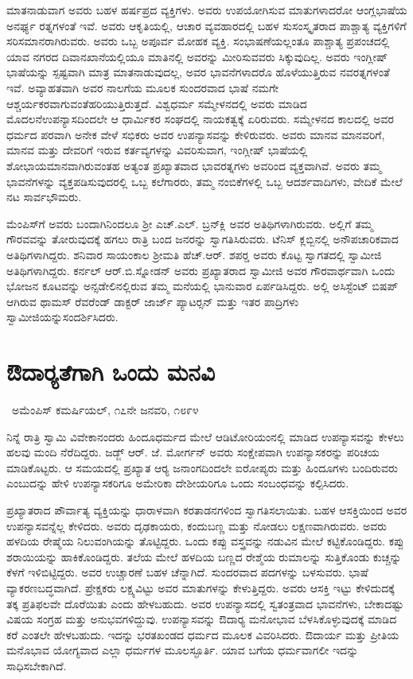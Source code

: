  ಮಾತನಾಡುವಾಗ ಅವರು ಬಹಳ ಹರ್ಷಪ್ರದ ವ್ಯಕ್ತಿಗಳು. ಅವರು ಉಪಯೋಗಿಸುವ ಮಾತುಗಳಾದರೋ ಆಂಗ್ಲಭಾಷೆಯ ಅನರ್ಘ್ಯ ರತ್ನಗಳಂತೆ ಇವೆ. ಅವರು ಆಕೃತಿಯಲ್ಲಿ, ಆಚಾರ ವ್ಯವಹಾರದಲ್ಲಿ ಬಹಳ ಸುಸಂಸ್ಕೃತರಾದ ಪಾಶ್ಚಾತ್ಯ ವ್ಯಕ್ತಿಗಳಿಗೆ ಸರಿಸಮಾನರಾಗಿರುವರು. ಅವರು ಒಬ್ಬ ಅಪೂರ್ವ ಮೋಹಕ ವ್ಯಕ್ತಿ. ಸಂಭಾಷಣೆಯಲ್ಲಂತೂ ಪಾಶ್ಚಾತ್ಯ ಪ್ರಪಂಚದಲ್ಲಿ ಯಾವ ನಗರದ ದಿವಾನಖಾನೆಯಲ್ಲಿಯೂ ಮಾತಿನಲ್ಲಿ ಅವರನ್ನು ಮೀರಿಸುವವರು ಸಿಕ್ಕುವುದಿಲ್ಲ. ಅವರು ಇಂಗ್ಲೀಷ್ ಭಾಷೆಯನ್ನು ಸ್ಪಷ್ಟವಾಗಿ ಮಾತ್ರ ಮಾತನಾಡುವುದಲ್ಲ, ಅವರ ಭಾವನೆಗಳಾದರೊ ಹೊಳೆಯುತ್ತಿರುವ ನವರತ್ನಗಳಂತೆ ಇವೆ. ಅವ್ಯಾಹತವಾಗಿ ಅವರ ನಾಲಗೆಯ ಮೂಲಕ ಸುಂದರವಾದ ಭಾಷೆ ನಮಗೇ ಆಶ್ಚರ್ಯಕರವಾಗುವಂತೆ\break ಹರಿಯುತ್ತಿರುತ್ತದೆ. ವಿಶ್ವಧರ್ಮ ಸಮ್ಮೇಳನದಲ್ಲಿ ಅವರು ಮಾಡಿದ ಮೊದಲನೆ\break ಉಪನ್ಯಾಸದಿಂದಲೇ ಆ ಧಾರ್ಮಿಕರ ಸಂಘದಲ್ಲಿ ನಾಯಕತ್ವಕ್ಕೆ ಏರಿರುವರು. ಸಮ್ಮೇಳನದ ಕಾಲದಲ್ಲಿ ಅವರ ಧರ್ಮದ ಪರವಾಗಿ ಅನೇಕ ವೇಳೆ ಸಭಿಕರು ಅವರ ಉಪನ್ಯಾಸವನ್ನು ಕೇಳಿರುವರು. ಅವರು ಮಾನವ ಮಾನವರಿಗೆ, ಮಾನವ ಮತ್ತು ದೇವರಿಗೆ ಇರುವ ಕರ್ತವ್ಯಗಳನ್ನು ವಿವರಿಸುವಾಗ, ಇಂಗ್ಲೀಷ್ ಭಾಷೆಯಲ್ಲಿ ಶೋಭಾಯಮಾನವಾಗಿರುವಂತಹ ಅತ್ಯಂತ ಪ್ರಖ್ಯಾತವಾದ ಭಾವರತ್ನಗಳು ಅವರಿಂದ ವ್ಯಕ್ತವಾಗಿವೆ. ಅವರು ತಮ್ಮ ಭಾವನೆಗಳನ್ನು ವ್ಯಕ್ತಪಡಿಸುವುದರಲ್ಲಿ ಒಬ್ಬ ಕಲೆಗಾರರು, ತಮ್ಮ ನಂಬಿಕೆಗಳಲ್ಲಿ ಒಬ್ಬ ಆದರ್ಶವಾದಿಗಳು, ವೇದಿಕೆ ಮೇಲೆ ನಟ ಸಾರ್ವಭೌಮರು. 

 ಮೆಂಪಿಸ್‍ಗೆ ಅವರು ಬಂದಾಗಿನಿಂದಲೂ ಶ‍್ರೀ ಎಚ್.ಎಲ್. ಬ್ರನ್‍ಕ್ಲಿ ಅವರ ಅತಿಥಿಗಳಾಗಿರುವರು. ಅಲ್ಲಿಗೆ ತಮ್ಮ ಗೌರವವನ್ನು ತೋರುವುದಕ್ಕೆ ಹಗಲು ರಾತ್ರಿ ಬಂದ ಜನರನ್ನು ಸ್ವಾಗತಿಸಿರುವರು. ಟೆನಿಸ್ ಕ್ಲಬ್ಬಿನಲ್ಲಿ ಅನೌಪಚಾರಿಕವಾದ ಅತಿಥಿಗಳಾಗಿದ್ದರು. ಶನಿವಾರ ಸಾಯಂಕಾಲ ಶ‍್ರೀಮತಿ ಹೆಚ್.ಆರ್. ಶಪರ‍್ಡ ಅವರು ಕೊಟ್ಟ ಸ್ವಾಗತದಲ್ಲಿ ಸ್ವಾಮೀಜಿ ಅತಿಥಿಗಳಾಗಿದ್ದರು. ಕರ್ನಲ್ ಆರ್.ಬಿ.ಸ್ನೋಡನ್ ಅವರು ಪ್ರಖ್ಯಾತರಾದ ಸ್ವಾಮೀಜಿ ಅವರ ಗೌರವಾರ್ಥವಾಗಿ ಒಂದು ಭೋಜನ ಕೂಟವನ್ನು ಅನ್ಸ‍ಡೇಲಿನಲ್ಲಿರುವ ತಮ್ಮ ಮನೆಯಲ್ಲಿ ಭಾನುವಾರ ಏರ್ಪಡಿಸಿದ್ದರು. ಅಲ್ಲಿ ಅಸಿಸ್ಟೆಂಟ್ ಬಿಷಪ್ ಆಗಿರುವ ಥಾಮಸ್ ರೆವರೆಂಡ್ ಡಾಕ್ಟರ್ ಜಾರ್ಜ್ ಪ್ಯಾಟರ್‍ಸನ್ ಮತ್ತು ಇತರ ಪಾದ್ರಿಗಳು ಸ್ವಾಮೀಜಿಯನ್ನು\break ಸಂದರ್ಶಿಸಿದರು.


\section*{ಔದಾರ‍್ಯತೆಗಾಗಿ ಒಂದು ಮನವಿ}

~\hfill{\fontsize{11pt}{13.75pt}\selectfont ಅಮೆಂಪಿಸ್ ಕಮರ್ಷಿಯಲ್, ೧೭ನೇ ಜನವರಿ, ೧೮೯೪ }

 ನಿನ್ನೆ ರಾತ್ರಿ ಸ್ವಾಮಿ ವಿವೇಕಾನಂದರು ಹಿಂದೂಧರ್ಮದ ಮೇಲೆ ಆಡಿಟೋರಿಯಂನಲ್ಲಿ ಮಾಡಿದ ಉಪನ್ಯಾಸವನ್ನು ಕೇಳಲು ಹಲವು ಮಂದಿ ನೆರೆದಿದ್ದರು. ಜಡ್ಜ್ ಆರ್. ಜೆ. ಮೋರ್ಗನ್ ಅವರು ಸಂಕ್ಷೇಪವಾಗಿ ಉಪನ್ಯಾಸಕರನ್ನು ಪರಿಚಯ ಮಾಡಿಕೊಟ್ಟರು. ಆ ಸಮಯದಲ್ಲಿ ಪ್ರಖ್ಯಾತ ಆರ‍್ಯ ಜನಾಂಗದಿಂದಲೇ ಐರೋಪ್ಯರು ಮತ್ತು ಹಿಂದೂಗಳು ಬಂದಿರುವರು ಎಂಬುದನ್ನು ಹೇಳಿ ಉಪನ್ಯಾಸಕರಿಗೂ ಅಮೇರಿಕಾ ದೇಶೀಯರಿಗೂ ಒಂದು ಸಂಬಂಧವನ್ನು ಕಲ್ಪಿಸಿದರು. 

\vskip 2pt

 ಪ್ರಖ್ಯಾತರಾದ ಪೌರ್ವಾತ್ಯ ವ್ಯಕ್ತಿಯನ್ನು ಧಾರಾಳವಾಗಿ ಕರತಾಡನಗಳಿಂದ ಸ್ವಾಗತಿಸಲಾಯಿತು. ಬಹಳ ಆಸಕ್ತಿಯಿಂದ ಅವರ ಉಪನ್ಯಾಸವನ್ನೆಲ್ಲ ಕೇಳಿದರು. ಅವರು ದೃಢಕಾಯರು, ಕಂದುಬಣ್ಣ ಮತ್ತು ನೋಡಲು ಲಕ್ಷಣವಾಗಿರುವರು. ಅವರು ಹಳದಿಯ ರೇಷ್ಮೆಯ ನಿಲುವಂಗಿಯನ್ನು ತೊಟ್ಟಿದ್ದರು. ಒಂದು ಕಪ್ಪು ವಸ್ತ್ರವನ್ನು ನಡುವಿನ ಮೇಲೆ ಕಟ್ಟಿಕೊಂಡಿದ್ದರು. ಕಪ್ಪು ಶರಾಯಿಯನ್ನು ಹಾಕಿಕೊಂಡಿದ್ದರು. ತಲೆಯ ಮೇಲೆ ಹಳದಿಯ ಬಣ್ಣದ ರೇಶ್ಮೆಯ ರುಮಾಲನ್ನು ಸುತ್ತಿಕೊಂಡು ಕುಚ್ಚನ್ನು ಕೆಳಗೆ ಇಳಿಬಿಟ್ಟಿದ್ದರು. ಅವರ ಉಚ್ಚಾರಣೆ ಬಹಳ ಚೆನ್ನಾಗಿದೆ. ಸುಂದರವಾದ ಪದಗಳನ್ನು ಬಳಸುವರು. ಭಾಷೆ ವ್ಯಾಕರಣಬದ್ಧವಾಗಿದೆ. ಪ್ರೇಕ್ಷಕರು ಲಕ್ಷ್ಯವಿಟ್ಟು ಅವರ ಮಾತುಗಳನ್ನು ಕೇಳುತ್ತಿದ್ದರು. ಅವರು ಆಸಕ್ತಿ ಇಟ್ಟು ಕೇಳಿದುದಕ್ಕೆ ತಕ್ಕ ಪ್ರತಿಫಲವೇ ದೊರೆಯಿತು ಎಂದು ಹೇಳಬಹುದು. ಅವರ ಉಪನ್ಯಾಸದಲ್ಲಿ ಸ್ವತಂತ್ರವಾದ ಭಾವನೆಗಳು, ಬೇಕಾದಷ್ಟು ವಿಷಯ ಸಂಗ್ರಹ ಮತ್ತು ಅನುಭವಗಳಿದ್ದುವು. ಉಪನ್ಯಾಸವನ್ನು ಔದಾರ‍್ಯ ಮನೋಭಾವ ಬೆಳಸಿಕೊಳ್ಳುವುದಕ್ಕೆ ಮಾಡಿದ ಕರೆ ಎಂತಲೇ ಹೇಳಬಹುದು. ಇದನ್ನು ಭರತಖಂಡದ ಧರ್ಮದ ಮೂಲಕ ವಿವರಿಸಿದರು. ಔದಾರ್ಯ ಮತ್ತು ಪ್ರೀತಿಯ ಮನೊಭಾವ ಯೋಗ್ಯವಾದ ಎಲ್ಲಾ ಧರ್ಮಗಳ ಮೂಲಸ್ಫೂರ್ತಿ. ಯಾವ ಬಗೆಯ ಧರ್ಮವಾಗಲೀ ಇದನ್ನು ಸಾಧಿಸಬೇಕಾಗಿದೆ. 

